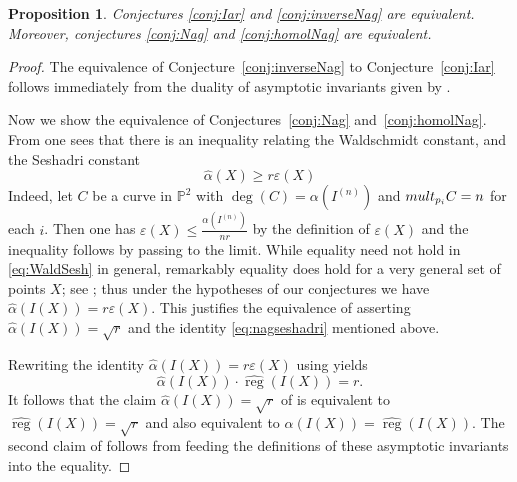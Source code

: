 \documentclass[12pt, reqno]{amsart}
\numberwithin{equation}{section}
\def\e{\ensuremath{\varepsilon}}
\renewcommand{\P}{{\mathbb P}}
\DeclareMathOperator{\reg}{reg}
\theoremstyle{plain} %
\newtheorem{prop}[thm]{Proposition}
\theoremstyle{definition}
\theoremstyle{remark}
\begin{document}
  
 \begin{prop}
 \label{prop:equivalent}
 Conjectures \ref{conj:Iar} and \ref{conj:inverseNag} are equivalent. Moreover, conjectures \ref{conj:Nag} and \ref{conj:homolNag} are equivalent. 
 \end{prop}
 \begin{proof}
 The equivalence of Conjecture~\ref{conj:inverseNag} to Conjecture~\ref{conj:Iar} follows immediately from the duality of asymptotic invariants given by .
 
 
Now we show the equivalence of Conjectures~\ref{conj:Nag} and~\ref{conj:homolNag}.  From  one sees that there is an inequality relating the  Waldschmidt constant, and the  Seshadri constant
 \begin{equation}
 \label{eq:WaldSesh}
 \widehat{\alpha}(X) \geq r \e(X)
 \end{equation}
  Indeed, let $C$ be a curve in $\P^2$ with  $\deg(C)=\alpha(I^{(n)})$ and ${\rm mult}_{p_i} C=n$ for each $i$. Then one has $\e(X)\leq \frac{\alpha(I^{(n)})}{nr}$ by the definition of $\e(X)$ and the inequality follows by passing to the limit.
 While equality need not hold in \eqref{eq:WaldSesh} in general, remarkably equality does hold for  a very general set of points $X$; see \cite[Lemma 2.3.1]{BH10}; thus under the hypotheses of our conjectures we have $ \widehat{\alpha}(I(X))=r\e(X)$. 
 This justifies the equivalence of  asserting  $\widehat{\alpha}(I(X))=\sqrt{r}$ and the identity \eqref{eq:nagseshadri} mentioned above.
 
 
 Rewriting the identity $ \widehat{\alpha}(I(X))=r\e(X)$ using   yields 
 \[ \widehat{\alpha}(I(X))\cdot \widehat{\reg}(I(X))=r.\]
It follows that the claim $\widehat{\alpha}(I(X))=\sqrt{r}$ of   is equivalent to $\widehat{\reg}(I(X)) =\sqrt{r}$ and also equivalent to $\widehat{\alpha}(I(X))=\widehat{\reg}(I(X))$.  The second claim of  follows from feeding the definitions of these asymptotic invariants into the equality.
\end{proof}
\end{document}
